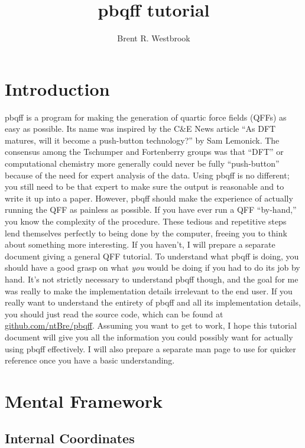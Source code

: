 \documentclass{article}
\title{pbqff tutorial}
\author{Brent R. Westbrook}
\begin{document}
\maketitle
\newpage
\tableofcontents
\newpage

\section{Introduction}

pbqff is a program for making the generation of quartic force fields
(QFFs) as easy as possible. Its name was inspired by the C\&E News
article ``As DFT matures, will it become a push-button technology?''
by Sam Lemonick. The consensus among the Tschumper and Fortenberry
groups was that ``DFT'' or computational chemistry more generally
could never be fully ``push-button'' because of the need for expert
analysis of the data. Using pbqff is no different; you still need to
be that expert to make sure the output is reasonable and to write it
up into a paper. However, pbqff should make the experience of actually
running the QFF as painless as possible. If you have ever run a QFF
``by-hand,'' you know the complexity of the procedure. These tedious
and repetitive steps lend themselves perfectly to being done by the
computer, freeing you to think about something more interesting. If
you haven't, I will prepare a separate document giving a general QFF
tutorial. To understand what pbqff is doing, you should have a good
grasp on what \textit{you} would be doing if you had to do its job by
hand. It's not strictly necessary to understand pbqff though, and the
goal for me was really to make the implementation details irrelevant
to the end user. If you really want to understand the entirety of
pbqff and all its implementation details, you should just read the
source code, which can be found at
\href{https://github.com/ntBre/pbqff}{github.com/ntBre/pbqff}. Assuming
you want to get to work, I hope this tutorial document will give you
all the information you could possibly want for actually using pbqff
effectively. I will also prepare a separate man page to use for
quicker reference once you have a basic understanding.

\section{Mental Framework}

\subsection{Internal Coordinates}
\end{document}

